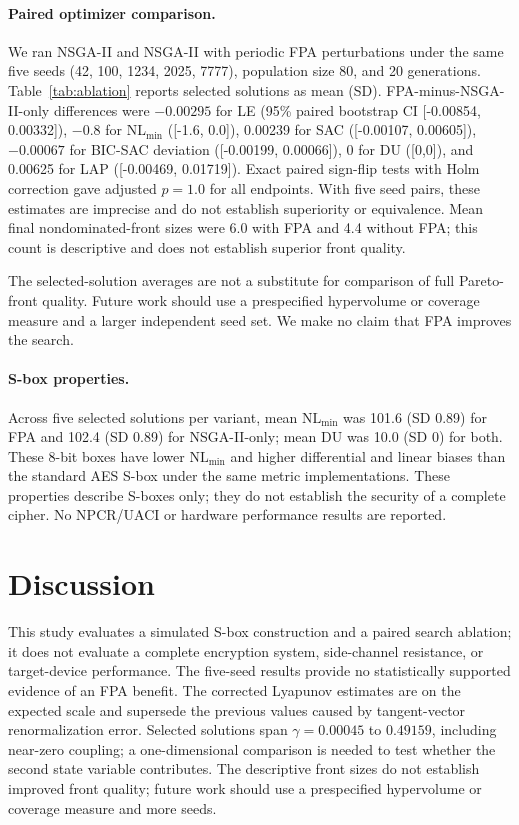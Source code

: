 \documentclass[11pt,a4paper]{article}
\begin{document}
\paragraph{Paired optimizer comparison.}
We ran NSGA-II and NSGA-II with periodic FPA perturbations under the
same five seeds (42, 100, 1234, 2025, 7777), population size 80,
and 20 generations. Table~\ref{tab:ablation} reports selected
solutions as mean (SD). FPA-minus-NSGA-II-only differences were
$-0.00295$ for LE (95\% paired bootstrap CI [-0.00854, 0.00332]),
$-0.8$ for NL$_{\min}$ ([-1.6, 0.0]), 0.00239 for SAC
([-0.00107, 0.00605]), $-0.00067$ for BIC-SAC deviation
([-0.00199, 0.00066]), 0 for DU ([0,0]), and 0.00625 for LAP
([-0.00469, 0.01719]). Exact paired sign-flip tests with Holm
correction gave adjusted $p=1.0$ for all endpoints. With five seed
pairs, these estimates are imprecise and do not establish superiority
or equivalence. Mean final nondominated-front sizes were 6.0 with FPA
and 4.4 without FPA; this count is descriptive and does not establish
superior front quality.

The selected-solution averages are not a substitute for comparison
of full Pareto-front quality. Future work should use a prespecified
hypervolume or coverage measure and a larger independent seed set.
We make no claim that FPA improves the search.

\paragraph{S-box properties.}
Across five selected solutions per variant, mean
$\mathrm{NL}_{\min}$ was 101.6 (SD 0.89) for FPA and 102.4
(SD 0.89) for NSGA-II-only; mean DU was 10.0 (SD 0) for both.
These 8-bit boxes have lower
$\mathrm{NL}_{\min}$ and higher differential and linear biases than
the standard AES S-box under the same metric implementations. These
properties describe S-boxes only; they do not establish the security
of a complete cipher. No NPCR/UACI or hardware performance results
are reported.

\section{Discussion}
\label{sec:discussion}

This study evaluates a simulated S-box construction and a paired
search ablation; it does not evaluate a complete encryption system,
side-channel resistance, or target-device performance. The five-seed
results provide no statistically supported evidence of an FPA benefit.
The corrected Lyapunov estimates are on the expected scale and supersede
the previous values caused by tangent-vector renormalization error.
Selected solutions span $\gamma=0.00045$ to $0.49159$, including
near-zero coupling; a one-dimensional comparison is needed to test
whether the second state variable contributes. The descriptive front
sizes do not establish improved front quality; future work should use
a prespecified hypervolume or coverage measure and more seeds.
\end{document}
